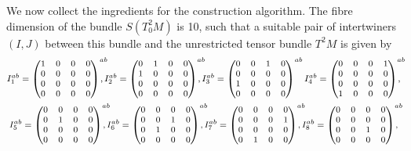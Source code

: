 We now collect the ingredients for the construction algorithm. The fibre dimension of the bundle $S(T^2_0M)$ is 10, such that a suitable pair of intertwiners $(I,J)$ between this bundle and the unrestricted tensor bundle $T^2M$ is given by
\begin{equation}\label{inter_metric_I}
  \footnotesize
  \begin{gathered}
    I^{ab}_1 = \begin{pmatrix}1 & 0 & 0 & 0 \\ 0 & 0 & 0 & 0 \\ 0 & 0 & 0 & 0 \\ 0 & 0 & 0 & 0\end{pmatrix}^{ab}\hspace{-1em}, I^{ab}_2 = \begin{pmatrix}0 & 1 & 0 & 0 \\ 1 & 0 & 0 & 0 \\ 0 & 0 & 0 & 0 \\ 0 & 0 & 0 & 0\end{pmatrix}^{ab}\hspace{-1em}, I^{ab}_3 = \begin{pmatrix}0 & 0 & 1 & 0 \\ 0 & 0 & 0 & 0 \\ 1 & 0 & 0 & 0 \\ 0 & 0 & 0 & 0\end{pmatrix}^{ab} I^{ab}_4 = \begin{pmatrix}0 & 0 & 0 & 1 \\ 0 & 0 & 0 & 0 \\ 0 & 0 & 0 & 0 \\ 1 & 0 & 0 & 0\end{pmatrix}^{ab}\hspace{-1em}, \\
  I^{ab}_5 = \begin{pmatrix}0 & 0 & 0 & 0 \\ 0 & 1 & 0 & 0 \\ 0 & 0 & 0 & 0 \\ 0 & 0 & 0 & 0\end{pmatrix}^{ab}\hspace{-1em}, I^{ab}_6 = \begin{pmatrix}0 & 0 & 0 & 0 \\ 0 & 0 & 1 & 0 \\ 0 & 1 & 0 & 0 \\ 0 & 0 & 0 & 0\end{pmatrix}^{ab}\hspace{-1em}, I^{ab}_7 = \begin{pmatrix}0 & 0 & 0 & 0 \\ 0 & 0 & 0 & 1 \\ 0 & 0 & 0 & 0 \\ 0 & 1 & 0 & 0\end{pmatrix}^{ab}\hspace{-1em}, I^{ab}_8 = \begin{pmatrix}0 & 0 & 0 & 0 \\ 0 & 0 & 0 & 0 \\ 0 & 0 & 1 & 0 \\ 0 & 0 & 0 & 0\end{pmatrix}^{ab}\hspace{-1em}, \\

\end{gathered}
\end{equation}
